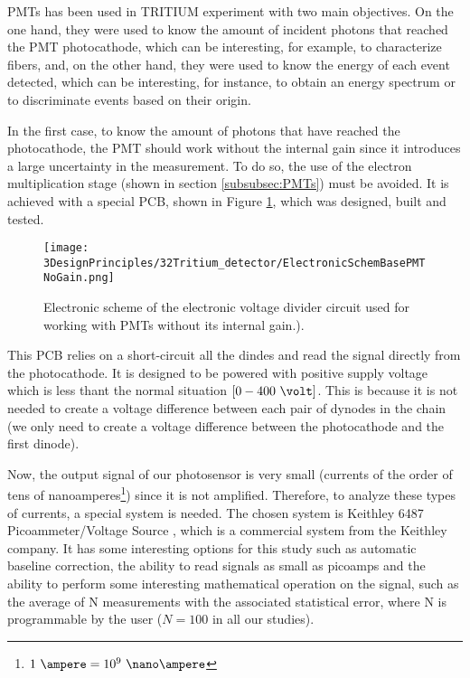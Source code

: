 PMTs has been used in TRITIUM experiment with two main objectives. On the one hand, they were used to know the amount of incident photons that reached the PMT photocathode, which can be interesting, for example, to characterize fibers, and, on the other hand, they were used to know the energy of each event detected, which can be interesting, for instance, to obtain an energy spectrum or to discriminate events based on their origin. %

In the first case, to know the amount of photons that have reached the photocathode, the PMT should work without the internal gain since it introduces a large uncertainty in the measurement. To do so, the use of the electron multiplication stage (shown in section \ref{subsubsec:PMTs}) must be avoided. It is achieved with a special PCB, shown in Figure \ref{fig:ElectronicSchemeBasePMTNoGain}, which was designed, built and tested.  


\begin{figure}[htbp]
\centering
\texttt{[image: 3DesignPrinciples/32Tritium\_detector/ElectronicSchemBasePMTNoGain.png]}
\caption{Electronic scheme of the electronic voltage divider circuit used for working with PMTs without its internal gain.).\label{fig:ElectronicSchemeBasePMTNoGain}}
\end{figure}

This PCB relies on a short-circuit all the dindes and read the signal directly from the photocathode. It is designed to be powered with positive supply voltage which is less thant the normal situation $[0-400~\volt]$. This is because it is not needed to create a voltage difference between each pair of dynodes in the chain (we only need to create a voltage difference between the photocathode and the first dinode).

Now, the output signal of our photosensor is very small (currents of the order of tens of nanoamperes\footnote{$1~\ampere=10^{9}~\nano\ampere$}) since it is not amplified. Therefore, to analyze these types of currents, a special system is needed. The chosen system is Keithley 6487 Picoammeter/Voltage Source \cite{DataSheetKeithley6487}, which is a commercial system from the Keithley company. It has some interesting options for this study such as automatic baseline correction, the ability to read signals as small as picoamps and the ability to perform some interesting mathematical operation on the signal, such as the average of N measurements with the associated statistical error, where N is programmable by the user ($N=100$ in all our studies).

